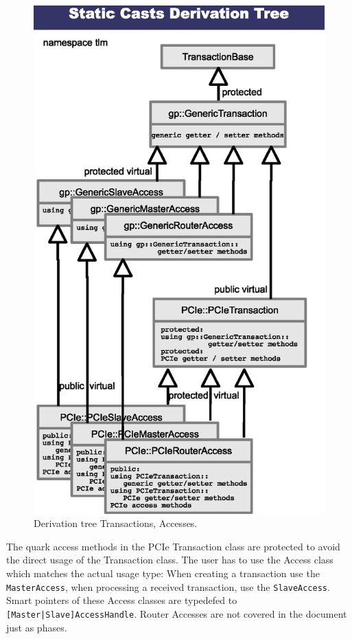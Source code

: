 \begin{figure}[htbp]%
	\centerline{
		\includegraphics{figures/StaticTransactionDerivationTree.eps}} 
	\caption{Derivation tree Transactions, Accesses.}
	\label{fig:TransactionDerivationTree}
\end{figure}

The quark access methods in the PCIe Transaction class are protected to avoid the direct usage of the Transaction class. The user has to use the Access class which matches the actual usage type: When creating a transaction use the \lstinline|MasterAccess|, when processing a received transaction, use the \mbox{\lstinline|SlaveAccess|.} Smart pointers of these Access classes are typedefed to \mbox{\lstinline![Master|Slave]AccessHandle!.} Router Accesses are not covered in the document just as phases.


